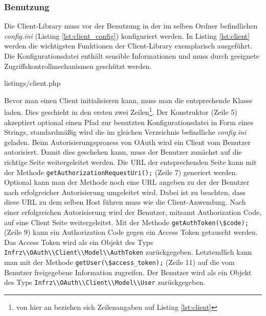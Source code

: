 \documentclass[12pt,a4paper,pointednumbers,abstracton]{scrartcl}
\newcommand{\code}[1]{\small\lstinline[style=InlinePHP]!#1!\normalsize}
\begin{document}
\subsubsection{Benutzung}

Die Client-Library muss vor der Benutzung in der im selben Ordner befindlichen \emph{config.ini} (Listing \ref{lst:client_config}) konfiguriert werden.
In Listing \ref{lst:client} werden die wichtigsten Funktionen der Client-Library exemplarisch ausgeführt.
Die Konfigurationsdatei enthält sensible Informationen und muss durch geeignete Zugriffskontrollmechanismen geschützt werden.

\begin{minipage}{\textwidth}
	
	{listings/client.php}
\end{minipage}

Bevor man einen Client initialisieren kann, muss man die entsprechende Klasse laden.
Dies geschieht in den ersten zwei Zeilen\footnote{von hier an beziehen sich Zeilenangaben auf Listing \ref{lst:client}}.
Der Konstruktor (Zeile 5) akzeptiert optional einen Pfad zur benutzten Konfigurationsdatei in Form eines Strings, standardmäßig wird die im gleichen Verzeichnis befindliche \emph{config.ini} geladen.
Beim Autorisierungsprozess von OAuth wird ein Client vom Benutzer autorisiert.
Damit dies geschehen kann, muss der Benutzer zunächst auf die richtige Seite weitergeleitet werden.
Die URL der entsprechenden Seite kann mit der Methode \code{getAuthorizationRequestUri();} (Zeile 7) generiert werden.
Optional kann man der Methode noch eine URL angeben zu der der Benutzer nach erfolgreicher Autorisierung umgeleitet wird.
Dabei ist zu beachten, dass diese URL zu dem selben Host führen muss wie die Client-Anwendung.
Nach einer erfolgreichen Autorisierung wird der Benutzer, mitsamt Authorization Code, auf eine Client Seite weitergeleitet.
Mit der Methode \code{getAuthToken(\$code);} (Zeile 9) kann ein Authorization Code gegen ein Access Token getauscht werden.
Das Access Token wird als ein Objekt des Typs \code{Infrz\\OAuth\\Client\\Model\\AuthToken} zurückgegeben.
Letztendlich kann man mit der Methode \code{getUser(\$access_token);} (Zeile 11) auf die vom Benutzer freigegebene Information zugreifen.
Der Benutzer wird als ein Objekt des Typs \code{Infrz\\OAuth\\Client\\Model\\User} zurückgegeben.
\end{document}
